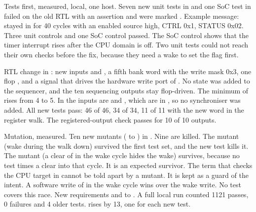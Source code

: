 \begin{record}

Tests first, measured, local, one host. Seven new unit tests in  and one SoC test in  failed on the old RTL with an assertion and were marked . Example message: stayed in  for 40 cycles with an enabled source high, CTRL 0x1, STATUS 0x02. Three unit controls and one SoC control passed. The SoC control shows that the timer interrupt rises after the CPU domain is off. Two unit tests could not reach their own checks before the fix, because they need a wake to set the flag first.

\end{record}

\begin{record}

RTL change in : new inputs  and , a fifth bank word  with the write mask 0x3, one flop , and a signal  that drives the hardware write port of . No state was added to the sequencer, and the ten sequencing outputs stay flop-driven. The minimum of  rises from 4 to 5. In  the inputs are  and , which are in , so no synchroniser was added. All new tests pass:  46 of 46,  34 of 34,  11 of 11 with the new word in the register walk. The registered-output check passes for 10 of 10 outputs.

\end{record}

\begin{record}

Mutation, measured. Ten new mutants ( to ) in . Nine are killed. The mutant  (wake during the walk down) survived the first test set, and the new test  kills it. The mutant  (a clear of  in the wake cycle hides the wake) survives, because no test times a clear into that cycle. It is an expected survivor. The term that checks the CPU target in  cannot be told apart by a mutant. It is kept as a guard of the intent. A software write of  in the wake cycle wins over the wake write. No test covers this race. New requirements  and  to . A full local  run counted 1121 passes, 0 failures and 4 older  tests.  rises by 13, one for each new test.

\end{record}

